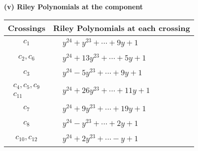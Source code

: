 \documentclass[1p]{elsarticle_modified}
\theoremstyle{definition}
\begin{document}
\newpage\renewcommand{\arraystretch}{1}
\flushleft \textbf{(v) Riley Polynomials at the component}\newline \\
\begin{tabular}{m{50pt}|m{274pt}}
Crossings & \hspace{64pt}Riley Polynomials at each crossing \\
\hline $$\begin{aligned}c_{1}\end{aligned}$$&$\begin{aligned}
&y^{24}+y^{23}+\cdots+9 y+1
\end{aligned}$\\
\hline $$\begin{aligned}c_{2},c_{6}\end{aligned}$$&$\begin{aligned}
&y^{24}+13 y^{23}+\cdots+5 y+1
\end{aligned}$\\
\hline $$\begin{aligned}c_{3}\end{aligned}$$&$\begin{aligned}
&y^{24}-5 y^{23}+\cdots+9 y+1
\end{aligned}$\\
\hline $$\begin{aligned}c_{4},c_{5},c_{9}\\c_{11}\end{aligned}$$&$\begin{aligned}
&y^{24}+26 y^{23}+\cdots+11 y+1
\end{aligned}$\\
\hline $$\begin{aligned}c_{7}\end{aligned}$$&$\begin{aligned}
&y^{24}+9 y^{23}+\cdots+19 y+1
\end{aligned}$\\
\hline $$\begin{aligned}c_{8}\end{aligned}$$&$\begin{aligned}
&y^{24}- y^{23}+\cdots+2 y+1
\end{aligned}$\\
\hline $$\begin{aligned}c_{10},c_{12}\end{aligned}$$&$\begin{aligned}
&y^{24}+2 y^{23}+\cdots- y+1
\end{aligned}$\\
\hline
\end{tabular}\\~\\
\end{document}
